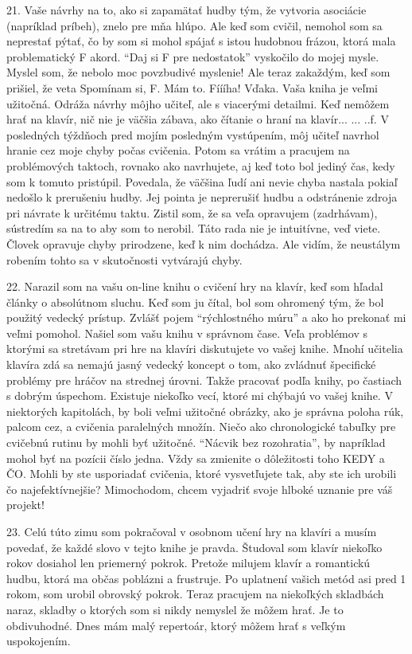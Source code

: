 21. Vaše návrhy na to, ako si zapamätať hudby tým, že vytvoria asociácie (napríklad príbeh), znelo pre mňa hlúpo. Ale keď som cvičil, nemohol som sa neprestať pýtať, čo by som si mohol spájať s istou hudobnou frázou, ktorá mala problematický F akord. “Daj si F pre nedostatok” vyskočilo do mojej mysle. Myslel som, že nebolo moc povzbudivé myslenie! Ale teraz zakaždým, keď som prišiel, že veta Spomínam si, F. Mám to. Fíííha! Vďaka. Vaša kniha je veľmi užitočná. Odráža návrhy môjho učiteľ, ale s viacerými detailmi. Keď nemôžem hrať na klavír, nič nie je väčšia zábava, ako čítanie o hraní na klavír... ... ..f. V posledných týždňoch pred mojím posledným vystúpením, môj učiteľ navrhol hranie cez moje chyby počas cvičenia. Potom sa vrátim a pracujem na problémových taktoch, rovnako ako navrhujete, aj keď toto bol jediný čas, kedy som k tomuto pristúpil. Povedala, že väčšina ľudí ani nevie chyba nastala pokiaľ nedošlo k prerušeniu hudby. Jej pointa je neprerušiť hudbu a odstránenie zdroja pri návrate k určitému taktu. Zistil som, že sa veľa opravujem (zadrhávam), sústredím sa na to aby som to nerobil. Táto rada nie je intuitívne, veď viete. Človek opravuje chyby prirodzene, keď k nim dochádza. Ale vidím, že neustálym robením tohto sa v skutočnosti vytvárajú chyby.
\medskip

22. Narazil som na vašu on-line knihu o cvičení hry na klavír, keď som hľadal články o absolútnom sluchu. Keď som ju čítal, bol som ohromený tým, že bol použitý vedecký prístup. Zvlášť pojem “rýchlostného múru” a ako ho prekonať mi veľmi pomohol. Našiel som vašu knihu v správnom čase. Veľa problémov s ktorými sa stretávam pri hre na klavíri diskutujete vo vašej knihe. Mnohí učitelia klavíra zdá sa nemajú jasný vedecký koncept o tom, ako zvládnuť špecifické problémy pre hráčov na  strednej úrovni. Takže pracovať podľa knihy, po častiach s dobrým úspechom. Existuje niekoľko vecí, ktoré mi chýbajú vo vašej knihe. V niektorých kapitolách, by boli veľmi užitočné obrázky, ako je správna poloha rúk, palcom cez, a cvičenia paralelných množín. Niečo ako chronologické tabuľky pre cvičebnú rutinu by mohli byť užitočné. “Nácvik bez rozohratia”, by napríklad mohol byť na pozícii číslo jedna. Vždy sa zmienite o dôležitosti toho KEDY a ČO. Mohli by ste usporiadať cvičenia, ktoré vysvetľujete tak, aby ste ich urobili čo najefektívnejšie? Mimochodom, chcem vyjadriť svoje hlboké uznanie pre váš projekt!
\medskip

23. Celú túto zimu som pokračoval v osobnom učení hry na klavíri a musím povedať, že každé slovo v tejto knihe je pravda. Študoval som klavír niekoľko rokov dosiahol len priemerný pokrok. Pretože milujem klavír a romantickú hudbu, ktorá ma občas poblázni a frustruje. Po uplatnení vašich metód asi pred 1 rokom, som urobil obrovský pokrok. Teraz pracujem na niekoľkých skladbách naraz,  skladby o ktorých som si nikdy nemyslel že môžem hrať. Je to obdivuhodné. Dnes mám malý repertoár, ktorý môžem hrať s veľkým uspokojením.
\medskip

